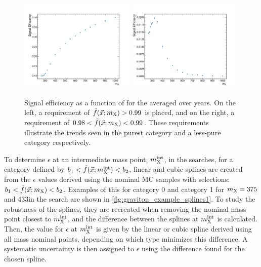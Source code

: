 \begin{figure}
  \centering
  \includegraphics[width=0.49\textwidth]{Figures/Dihiggs/signal/shape_change/graviton_sigeff.pdf}
  \includegraphics[width=0.49\textwidth]{Figures/Dihiggs/signal/shape_change/graviton_sigeff_less.pdf}
  \caption[Signal Efficiencies as a Function of \mX in \XTwoHH Search]{Signal efficiency as a function of \mX for the \XTwoHH averaged over years. On the left, a requirement of $\tilde{f}(\vec{x};m_{\mathrm{X}}) > 0.99$ is placed, and on the right, a requirement of $0.98 < \tilde{f}(\vec{x};m_{\mathrm{X}}) < 0.99$. These requirements illustrate the trends seen in the purest category and a less-pure category respectively.}\label{fig:graviton_sigeff_change}
\end{figure}

To determine $\epsilon$ at an intermediate mass point, $m_{\mathrm{X}}^{\text{int}}$, in the \XHH searches, for a category defined by $b_1 < \tilde{f}(\vec{x};m_{\mathrm{X}}^{\text{int}}) < b_2$, linear and cubic splines are created from the $\epsilon$ values derived using the nominal MC samples with selections: $b_1 < \tilde{f}(\vec{x};m_{\mathrm{X}}) < b_2$. Examples of this for category 0 and category 1 for $m_{\mathrm{X}}=375$ and 433\GeV in the \XTwoHH search are shown in \cref{fig:graviton_example_splines1}. To study the robustness of the splines, they are recreated when removing the nominal mass point closest to $m_{\mathrm{X}}^{\text{int}}$, and the difference between the splines at $m_{\mathrm{X}}^{\text{int}}$ is calculated. Then, the value for $\epsilon$ at $m_{\mathrm{X}}^{\text{int}}$ is given by the linear or cubic spline derived using all mass nominal points, depending on which type minimizes this difference. A systematic uncertainty is then assigned to $\epsilon$ using the difference found for the chosen spline.

